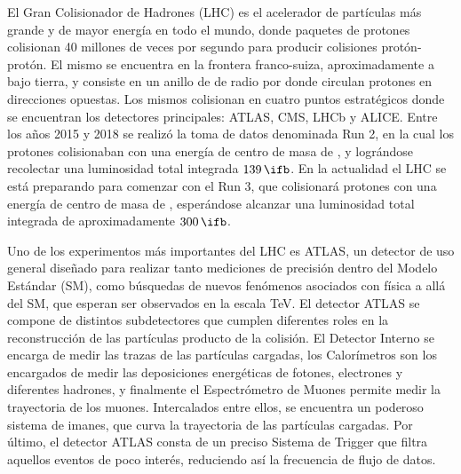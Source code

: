 El Gran Colisionador de Hadrones (LHC) es el acelerador de partículas más grande y de mayor energía en todo el mundo, donde paquetes de protones colisionan 40 millones de veces por segundo para producir colisiones protón-protón. El mismo se encuentra en la frontera franco-suiza, aproximadamente a  bajo tierra, y consiste en un anillo de  de radio por donde circulan protones en direcciones opuestas. Los mismos colisionan en cuatro puntos estratégicos donde se encuentran los detectores principales: ATLAS, CMS, LHCb y ALICE.
Entre los años 2015 y 2018 se realizó la toma de datos denominada Run 2, en la cual los protones colisionaban con una energía de centro de masa de , y lográndose recolectar una luminosidad total integrada $139\,\ifb$. En la actualidad el LHC se está preparando para comenzar con el Run 3, que colisionará protones con una energía de centro de masa de , esperándose alcanzar una luminosidad total integrada de aproximadamente $300\,\ifb$.

Uno de los experimentos más importantes del LHC es ATLAS, un detector de uso general diseñado para realizar tanto mediciones de precisión dentro del Modelo Estándar (SM), como búsquedas de nuevos fenómenos asociados con física a allá del SM, que esperan ser observados en la escala TeV. El detector ATLAS se compone de distintos subdetectores que cumplen diferentes roles en la reconstrucción de las partículas producto de la colisión. El Detector Interno se encarga de medir las trazas de las partículas cargadas, los Calorímetros son los encargados de medir las deposiciones energéticas de fotones, electrones y diferentes hadrones, y finalmente el Espectrómetro de Muones permite medir la trayectoria de los muones. Intercalados entre ellos, se encuentra un poderoso sistema de imanes, que curva la trayectoria de las partículas cargadas. Por último, el detector ATLAS consta de un preciso Sistema de Trigger que filtra aquellos eventos de poco interés, reduciendo así la frecuencia de flujo de datos.



